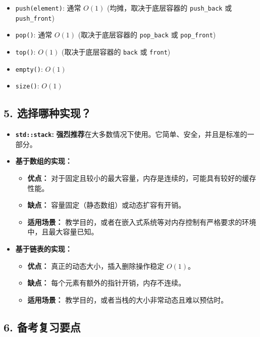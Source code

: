\begin{itemize}
	\item \lstinline{push(element)}: 通常 $O(1)$ (均摊，取决于底层容器的 \lstinline{push_back} 或 \lstinline{push_front})
	\item \lstinline{pop()}: 通常 $O(1)$ (取决于底层容器的 \lstinline{pop_back} 或 \lstinline{pop_front})
	\item \lstinline{top()}: $O(1)$ (取决于底层容器的 \lstinline{back} 或 \lstinline{front})
	\item \lstinline{empty()}: $O(1)$
	\item \lstinline{size()}: $O(1)$
\end{itemize}

\subsection{5. 选择哪种实现？}

\begin{itemize}
	\item \textbf{\lstinline{std::stack}:} \textbf{强烈推荐}在大多数情况下使用。它简单、安全，并且是标准的一部分。
	\item \textbf{基于数组的实现：}
	\begin{itemize}
		\item \textbf{优点：} 对于固定且较小的最大容量，内存是连续的，可能具有较好的缓存性能。
		\item \textbf{缺点：} 容量固定（静态数组）或动态扩容有开销。
		\item \textbf{适用场景：} 教学目的，或者在嵌入式系统等对内存控制有严格要求的环境中，且最大容量已知。
	\end{itemize}
	\item \textbf{基于链表的实现：}
	\begin{itemize}
		\item \textbf{优点：} 真正的动态大小，插入删除操作稳定 $O(1)$。
		\item \textbf{缺点：} 每个元素有额外的指针开销，内存不连续。
		\item \textbf{适用场景：} 教学目的，或者当栈的大小非常动态且难以预估时。
	\end{itemize}
\end{itemize}

\subsection{6. 备考复习要点}


